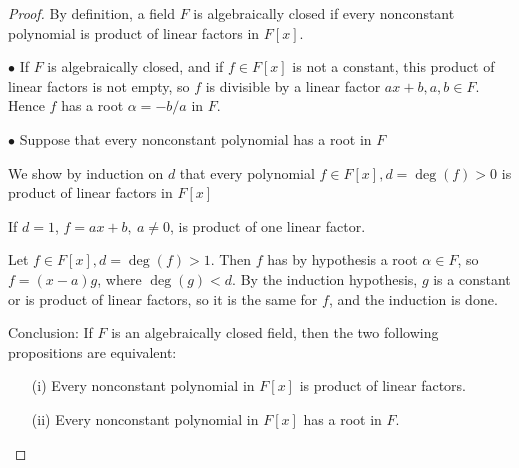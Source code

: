 \documentclass[11pt,a4paper]{article}
\begin{document}
\begin{proof}
By definition, a field $F$ is algebraically closed if every nonconstant polynomial is product of linear factors in $F[x]$.

$\bullet$ If $F$ is algebraically closed, and if $f\in F[x]$ is not a constant, this product of linear factors is not empty, so $f$ is divisible by a linear factor $ax+b, a,b \in F$. Hence $f$ has a root $\alpha = -b/a$ in $F$.

$\bullet$ Suppose that every nonconstant polynomial has a root in $F$

We show by induction on $d$ that every polynomial $f \in F[x], d = \deg(f) >0$ is product of linear factors in $F[x]$

If $d=1$, $f = ax+b, \ a\ne 0$, is product of one linear factor.

Let $f \in F[x], d = \deg(f) >1$. Then $f$ has by hypothesis a root $\alpha \in F$, so $f = (x-a)g$, where $\deg(g)<d$. By the induction hypothesis, $g$ is a constant or is product of linear factors, so it is the same for $f$, and the induction is done.

Conclusion: If $F$ is an algebraically closed field, then the two following propositions are equivalent:
\begin{enumerate}
\item[(i)] Every nonconstant polynomial in $F[x]$ is product of linear factors.
\item[(ii)] Every nonconstant polynomial in $F[x]$ has a root in $F$.
\end{enumerate}
\end{proof}
\end{document}
